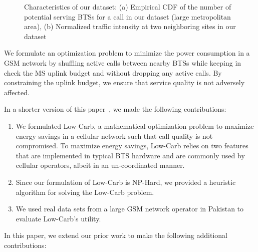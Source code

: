 \begin{figure}
\centering
{}
\caption{Characteristics of our dataset: (a) Empirical CDF of the number of potential serving BTSs for a call in our dataset (large metropolitan area), (b) Normalized traffic intensity at two neighboring sites in our dataset} 
\label{fig:trafficmodelstats}
\end{figure}

We formulate an optimization problem to minimize the power
consumption in a GSM network by shuffling active calls between
nearby BTSs while keeping in check the MS uplink budget and without dropping any active calls. By constraining the uplink budget, we ensure that service quality is not adversely affected. 

In a shorter version of this paper~\cite{ilyas:lowcarb:globecom13}, we made the following contributions:
\begin{enumerate}
\item We formulated Low-Carb, a mathematical optimization problem to maximize energy savings in a cellular network such that call quality is not compromised. To maximize energy savings, Low-Carb relies on two features that are implemented in typical BTS hardware and are commonly used by cellular operators, albeit in an un-coordinated manner.
\item Since our formulation of Low-Carb is NP-Hard, we provided a heuristic algorithm for solving the Low-Carb problem.
\item We used real data sets from a large GSM network operator in Pakistan to evaluate Low-Carb's utility.
\end{enumerate}
In this paper, we extend our prior work to make the following additional contributions:

